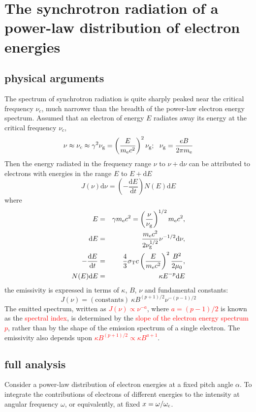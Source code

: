 \documentclass[12pt,a4paper]{article}
\newcommand{\dif}{\mathrm{d}}
\begin{document}
\section{The synchrotron radiation of a power-law distribution of electron energies}
\subsection{physical arguments}
The spectrum of synchrotron radiation is quite sharply peaked near the critical frequency $\nu_c$,  much narrower than the breadth of the power-law electron energy spectrum. Assumed that an electron of energy $E$ radiates away its energy at the critical frequency $\nu_c$,
\begin{equation}
\nu \approx \nu_c \approx \gamma^2 \nu_{\rm g} = \left(\frac{E}{m_{\rm e}c^2} \right)^2 \nu_{\rm g}; ~~ \nu_{\rm g} = \frac{eB}{2\pi m_{\rm e}}
\end{equation}
Then the energy radiated in the frequency range $\nu$ to $\nu+\dif \nu$ can be attributed to electrons with energies in the range $E$ to $E + \dif E$
\begin{equation}
J(\nu) \dif \nu = \left(-\frac{\dif E}{\dif t} \right) N(E) \dif E
\end{equation}
where
\begin{eqnarray*}
E &=& \gamma m_{\rm e} c^2 = \left(\frac{\nu}{\nu_{\rm g}} \right)^{1/2} m_{\rm e} c^2 , \\
\dif E &=& \frac{m_{\rm e} c^2}{2 \nu_{\rm g}^{1/2}} \nu^{-1/2} \dif \nu , \\
-\frac{\dif E}{\dif t} &=& \frac{4}{3} \sigma_{\rm T} c \left(\frac{E}{m_{\rm e} c^2} \right)^2 \frac{B^2}{2\mu_0} , \\
N(E) \dif E &=& \kappa E^{-p} \dif E
\end{eqnarray*}
the emissivity is expressed in terms of $\kappa$, $B$, $\nu$ and fundamental constants:
\begin{equation}
J(\nu) = (\text{constants})~ \kappa B^{(p+1)/2} \nu^{-(p-1)/2} 
\end{equation}
The emitted spectrum, written as \textcolor{red}{$J(\nu) \propto \nu^{-a}$}, where \textcolor{red}{$a = (p-1)/2$} is known as the \textcolor{red}{spectral index}, is determined by the \textcolor{red}{slope of the electron energy spectrum $p$}, rather than by the shape of the emission spectrum of a single electron. The emissivity also depends upon \textcolor{red}{$\kappa B^{(p+1)/2} \propto \kappa B^{a+1}$}.

\subsection{full analysis}
Consider a power-law distribution of electron energies at a fixed pitch angle $\alpha$. To integrate the contributions of electrons of different energies to the intensity at angular frequency $\omega$, or equivalently, at fixed $x = \omega/\omega_{\rm c}$.
\end{document}
